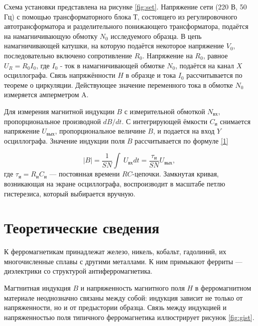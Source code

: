 \documentclass[a4paper, 12pt]{article}
\begin{document}
\vspace{1 cm}

Схема установки представлена на рисунке \ref{fig:set}. Напряжение сети (220 В, 50 Гц) с помощью трансформаторного блока Т, состоящего из регулировочного автотрансформатора и 
разделительного понижающего трансформатора, подаётся на намагничивающую обмотку $N_0$ исследуемого образца.
В цепь намагничивающей катушки, на которую подаётся некоторое напряжение $V_0$, последовательно включено сопротивление $R_0$. Напряжение на $R_0$, 
равное $U_R = R_0I_0$, где $I_0$ - ток в намагничивающей обмотке $N_0$, подаётся на канал $X$ осциллографа. Связь напряжённости $H$ в
образце и тока $I_0$ рассчитывается по теореме о циркуляции. Действующее значение переменного тока в обмотке $N_0$ измеряется амперметром A.

Для измерения магнитной индукции $B$ с измерительной обмоткой $N_\text{вх}$, пропорциональное производной $dB/dt$. С интегрирующей
ёмкости $C_\text{и}$ снимается напряжение $U_\text{вых}$, пропорциональное величине $B$, и подается на вход $Y$ осциллографа. Значение индукции 
поля $B$ рассчитывается по формуле \ref{1}

\begin{equation}\label{1}
	|B| = \frac{1}{SN} \int\ U_\text{вх} dt = \frac{\tau_\text{и}}{SN}U_\text{вых},
\end{equation}
где $\tau_\text{и} = R_\text{и} C_\text{и}$ --- постоянная времени $RC$-цепочки.
Замкнутая кривая, возникающая на экране осциллографа, воспроизводит в масштабе петлю гистерезиса, который выбирается
вручную.

\section{Теоретические сведения}

К ферромагнетикам принадлежат железо, никель, кобальт, гадолиний,
их многочисленные сплавы с другими металлами. К ним примыкают ферриты --- диэлектрики
со структурой антиферромагнетика.

Магтнитная индукция \textbf{$B$} и напряженность магнитного поля 
\textbf{$H$} в ферромагнитном материале неоднозначно связаны между собой:
индукция зависит не только от напряженности, но и от предыстории образца.
Связь между индукцией и напряженностью поля типичного ферромагнетика 
иллюстрирует рисунок \ref{fig:gist}.
\end{document}
